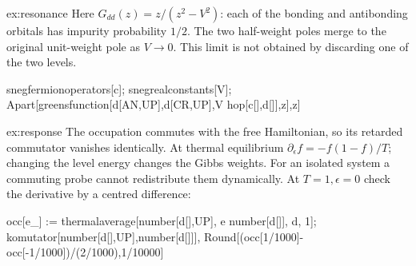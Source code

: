 \begin{solution}{ex:resonance}
Here $G_{dd}(z)=z/(z^2-V^2)$: each of the bonding and antibonding
orbitals has impurity probability $1/2$. The two half-weight poles
merge to the original unit-weight pole as $V\to0$. This limit is
not obtained by discarding one of the two levels.
\begin{wl}
snegfermionoperators[c];
snegrealconstants[V];
Apart[greensfunction[d[AN,UP],d[CR,UP],V hop[c[],d[]],z],z]
\end{wl}
\end{solution}
\begin{solution}{ex:response}
The occupation commutes with the free Hamiltonian, so its retarded
commutator vanishes identically. At thermal equilibrium
$\partial_\epsilon f=-f(1-f)/T$; changing the level energy changes
the Gibbs weights. For an isolated system a commuting probe cannot
redistribute them dynamically. At $T=1,\epsilon=0$ check the derivative
by a centred difference:
\begin{wl}
occ[e_] := thermalaverage[number[d[],UP], e number[d[]], {d}, 1];
{komutator[number[d[],UP],number[d[]]],
 Round[(occ[1/1000]-occ[-1/1000])/(2/1000),1/10000]}
\end{wl}
\end{solution}
